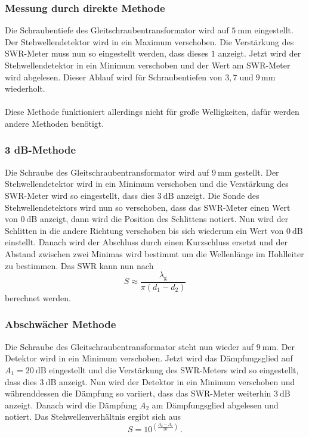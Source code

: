 \subsubsection{Messung durch direkte Methode}
Die Schraubentiefe des Gleitschraubentransformator wird auf $\SI{5}{\milli\meter}$ eingestellt.
Der Stehwellendetektor wird in ein Maximum verschoben.
Die Verstärkung des SWR-Meter muss nun so eingestellt werden, dass dieses $1$ anzeigt.
Jetzt wird der Stehwellendetektor in ein Minimum verschoben und der Wert am SWR-Meter wird abgelesen.
Dieser Ablauf wird für Schraubentiefen von $3,7 \; \text{und} \; 9 \, \si{\milli\meter}$ wiederholt.
\\\\
Diese Methode funktioniert allerdings nicht für große Welligkeiten, dafür werden andere Methoden benötigt.
\subsubsection{3 dB-Methode}
Die Schraube des Gleitschraubentransformator wird auf $\SI{9}{\milli\meter}$ gestellt.
Der Stehwellendetektor wird in ein Minimum verschoben und die Verstärkung des SWR-Meter wird so eingestellt, dass dies $\SI{3}{\dB}$ anzeigt.
Die Sonde des Stehwellendetektors wird nun so verschoben, dass das SWR-Meter einen Wert von $\SI{0}{\dB}$ anzeigt, dann wird die Position des Schlittens notiert.
Nun wird der Schlitten in die andere Richtung verschoben bis sich wiederum ein Wert von $\SI{0}{\dB}$ einstellt.
Danach wird der Abschluss durch einen Kurzschluss ersetzt und der Abstand zwischen zwei Minimas wird bestimmt um die Wellenlänge im Hohlleiter zu bestimmen.
Das SWR kann nun nach 
\begin{equation}
    S \approx \frac{\lambda _\text{g}}{\pi \left ( d_1 - d_2 \right )}
    \label{eq:3db_SWR}
\end{equation}
berechnet werden.

\subsubsection{Abschwächer Methode}
\label{sec:abschwaecher_methode}
Die Schraube des Gleitschraubentransformator steht nun wieder auf $\SI{9}{\milli \meter}$.
Der Detektor wird in ein Minimum verschoben.
Jetzt wird das Dämpfungsglied auf $A_1 = \SI{20}{\dB}$ eingestellt und die Verstärkung des SWR-Meters wird so eingestellt, dass dies $\SI{3}{\dB}$ anzeigt.
Nun wird der Detektor in ein Minimum verschoben und währenddessen die Dämpfung so variiert, dass das SWR-Meter weiterhin $\SI{3}{\dB}$ anzeigt.
Danach wird die Dämpfung $A_2$ am Dämpfungsglied abgelesen und notiert.
Das Stehwellenverhältnis ergibt sich aus
\begin{equation}
    S = 10^{\left (\frac{A_2 -A_1}{20} \right )} \, .
    \label{eq:daempfung_SWR}
\end{equation}